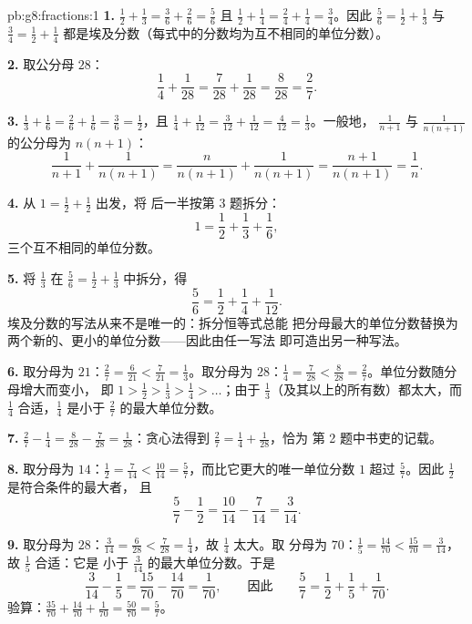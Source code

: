 \begin{solution}{pb:g8:fractions:1}
\textbf{1.} $\frac12 + \frac13 = \frac36 + \frac26 = \frac56$ 且
$\frac12 + \frac14 = \frac24 + \frac14 = \frac34$。因此
$\frac56 = \frac12 + \frac13$ 与 $\frac34 = \frac12 + \frac14$
都是埃及分数（每式中的分数均为互不相同的单位分数）。

\textbf{2.} 取公分母 $28$：
\[
\frac14 + \frac{1}{28} = \frac{7}{28} + \frac{1}{28}
= \frac{8}{28} = \frac{2}{7} .
\]

\textbf{3.} $\frac13 + \frac16 = \frac26 + \frac16 = \frac36 =
\frac12$，且 $\frac14 + \frac{1}{12} = \frac{3}{12} +
\frac{1}{12} = \frac{4}{12} = \frac13$。一般地，
$\frac{1}{n+1}$ 与 $\frac{1}{n(n+1)}$ 的公分母为
$n(n+1)$：
\[
\frac{1}{n+1} + \frac{1}{n(n+1)}
= \frac{n}{n(n+1)} + \frac{1}{n(n+1)}
= \frac{n+1}{n(n+1)}
= \frac{1}{n} .
\]

\textbf{4.} 从 $1 = \frac12 + \frac12$ 出发，将
后一半按第 3 题拆分：
\[
1 = \frac12 + \frac13 + \frac16 ,
\]
三个互不相同的单位分数。

\textbf{5.} 将 $\frac13$ 在 $\frac56 = \frac12 +
\frac13$ 中拆分，得
\[
\frac56 = \frac12 + \frac14 + \frac{1}{12} .
\]
埃及分数的写法从来不是唯一的：拆分恒等式总能
把分母最大的单位分数替换为
两个新的、更小的单位分数——因此由任一写法
即可造出另一种写法。

\textbf{6.} 取分母为 $21$：$\frac27 = \frac{6}{21} <
\frac{7}{21} = \frac13$。取分母为 $28$：$\frac14 =
\frac{7}{28} < \frac{8}{28} = \frac27$。单位分数随分母增大而变小，
即 $1 > \frac12 > \frac13 > \frac14 >
\dots$；由于 $\frac13$（及其以上的所有数）都太大，而
$\frac14$ 合适，$\frac14$ 是小于
$\frac27$ 的最大单位分数。

\textbf{7.} $\frac27 - \frac14 = \frac{8}{28} - \frac{7}{28} =
\frac{1}{28}$：贪心法得到
$\frac27 = \frac14 + \frac{1}{28}$，恰为
第 2 题中书吏的记载。

\textbf{8.} 取分母为 $14$：$\frac12 = \frac{7}{14} <
\frac{10}{14} = \frac57$，而比它更大的唯一单位分数
$1$ 超过 $\frac57$。因此 $\frac12$ 是符合条件的最大者，
且
\[
\frac57 - \frac12 = \frac{10}{14} - \frac{7}{14} = \frac{3}{14} .
\]

\textbf{9.} 取分母为 $28$：$\frac{3}{14} = \frac{6}{28} <
\frac{7}{28} = \frac14$，故 $\frac14$ 太大。取
分母为 $70$：$\frac15 = \frac{14}{70} < \frac{15}{70} =
\frac{3}{14}$，故 $\frac15$ 合适：它是
小于 $\frac{3}{14}$ 的最大单位分数。于是
\[
\frac{3}{14} - \frac15 = \frac{15}{70} - \frac{14}{70}
= \frac{1}{70},
\qquad\text{因此}\qquad
\frac57 = \frac12 + \frac15 + \frac{1}{70} .
\]
验算：$\frac{35}{70} + \frac{14}{70} + \frac{1}{70} =
\frac{50}{70} = \frac57$。


\end{solution}
